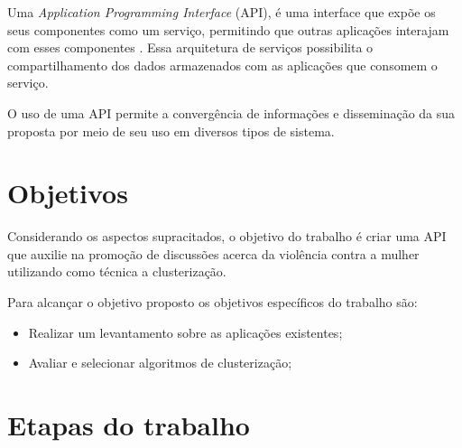 
Uma \textit{Application Programming Interface} (API), é uma interface que expõe os seus componentes como um serviço, permitindo que outras aplicações interajam com esses componentes \cite{wagh2012comparative, understanding_web}. Essa arquitetura de serviços possibilita o compartilhamento dos dados armazenados com as aplicações que consomem o serviço. 

O uso de uma API permite a convergência de informações e disseminação da sua proposta por meio de seu uso em diversos tipos de sistema.



\section{Objetivos}


Considerando os aspectos supracitados, o objetivo do trabalho é criar uma API que auxilie na promoção de discussões acerca da violência contra a mulher utilizando como técnica a clusterização.

Para alcançar o objetivo proposto os objetivos específicos do trabalho são:
\begin{itemize}
	\item Realizar um levantamento sobre as aplicações existentes;
	\item Avaliar e selecionar algoritmos de clusterização;
\end{itemize}

\section{Etapas do trabalho}

